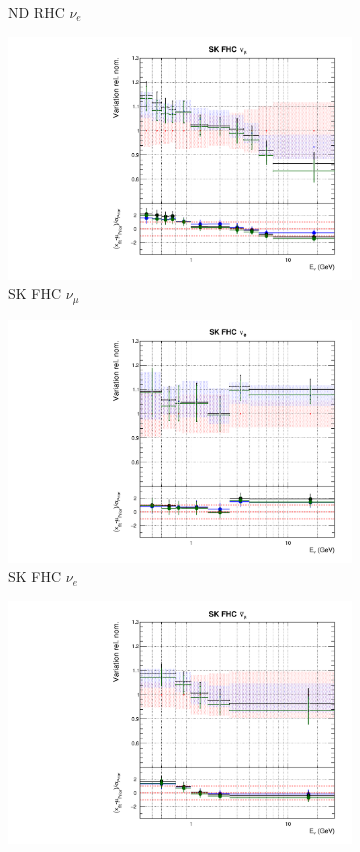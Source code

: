 \begin{figure}
\begin{subfigure}{0.24\textwidth}
  \caption{ND RHC $\nu_e$}
\end{subfigure}
\begin{subfigure}{0.24\textwidth}
  \centering
  \includegraphics[width=0.95\linewidth]{figs/polydataflux_8}
  \caption{SK FHC $\nu_{\mu}$}
\end{subfigure}
\begin{subfigure}{0.24\textwidth}
  \centering
  \includegraphics[width=0.95\linewidth]{figs/polydataflux_9}
  \caption{SK FHC $\nu_e$}
\end{subfigure}
\begin{subfigure}{0.24\textwidth}
  \centering
  \includegraphics[width=0.95\linewidth]{figs/polydataflux_10}

\end{subfigure}
\end{figure}
